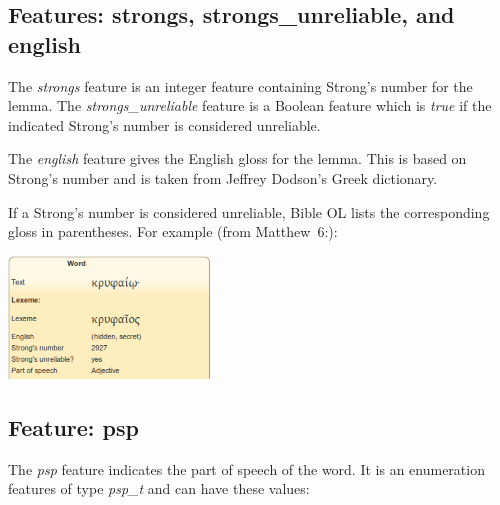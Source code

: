 \documentclass[11pt,oneside,a4paper]{memoir}
\newcommand*{\bibleref}[3]{#1~#2\thinspace:\thinspace#3}
\begin{document}
\subsection{Features: strongs, strongs\_unreliable, and english}

The \emph{strongs} feature is an integer feature containing Strong's number for the lemma. The
\emph{strongs\_unreliable} feature is a Boolean feature which is \emph{true} if the indicated
Strong's number is considered unreliable.

The \emph{english} feature gives the English gloss for the lemma. This is based on Strong's number
and is taken from Jeffrey Dodson's Greek dictionary.

If a Strong's number is considered unreliable, Bible OL lists the corresponding gloss in
parentheses. For example (from \bibleref{Matthew}{6}{18}):

\begin{center}
  \includegraphics[width=0.4\textwidth]{unreliable.png}
\end{center}

\subsection{Feature: psp}

The \emph{psp} feature indicates the part of speech of the word. It is an enumeration features of
type \emph{psp\_t} and can have these values:
\end{document}
